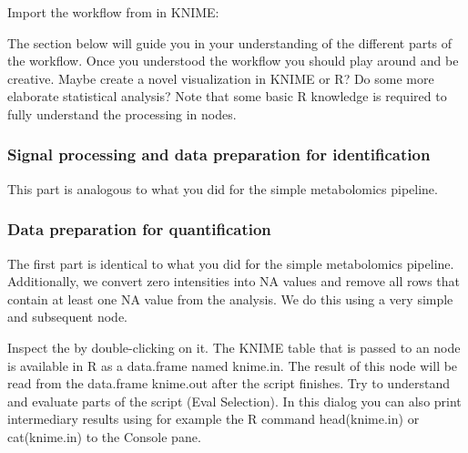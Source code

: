 \begin{task}
Import the workflow from  in KNIME: 
\end{task}

The section below will guide you in your understanding of the different parts of the workflow. Once you understood the workflow you should play around and be creative. Maybe create a novel visualization in KNIME or R? Do some more elaborate statistical analysis? Note that some basic R knowledge is required to fully understand the processing in  nodes.

\subsubsection{Signal processing and data preparation for identification}
This part is analogous to what you did for the simple metabolomics pipeline.

\subsubsection{Data preparation for quantification}
The first part is identical to what you did for the simple metabolomics pipeline. Additionally, we convert zero intensities into NA values and remove all rows that contain at least one NA value from the analysis. We do this using a very simple  and subsequent  node.

\begin{task}
Inspect the  by double-clicking on it. The KNIME table that is passed to an  node is available in R as a data.frame named knime.in. The result of this node will be read from the data.frame knime.out after the script finishes. Try to understand and evaluate parts of the script (Eval Selection). In this dialog you can also print intermediary results using for example the R command head(knime.in) or cat(knime.in) to the Console pane.
\end{task}

